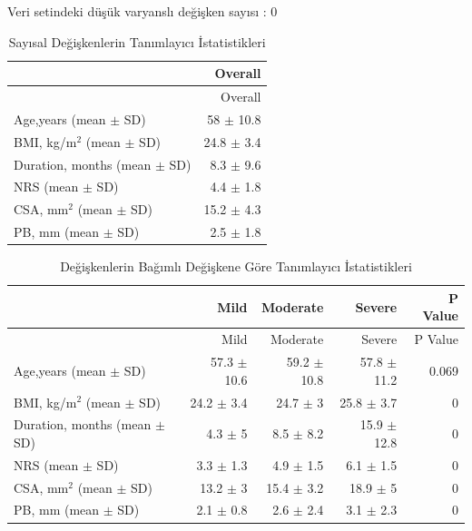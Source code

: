 \documentclass[12pt,twoside]{deuthesis}
\begin{document}
Veri setindeki düşük varyanslı değişken sayısı : 0
\begin{longtable}[]{@{}lr@{}}
\caption{\label{tab:deneme} Sayısal Değişkenlerin Tanımlayıcı İstatistikleri}\tabularnewline
\toprule
& Overall \\
\midrule
\endfirsthead
\toprule
& Overall \\
\midrule
\endhead
Age,years (mean \(\pm\) SD) & 58 \(\pm\) 10.8 \\
BMI, kg/m\(^2\) (mean \(\pm\) SD) & 24.8 \(\pm\) 3.4 \\
Duration, months (mean \(\pm\) SD) & 8.3 \(\pm\) 9.6 \\
NRS (mean \(\pm\) SD) & 4.4 \(\pm\) 1.8 \\
CSA, mm\(^2\) (mean \(\pm\) SD) & 15.2 \(\pm\) 4.3 \\
PB, mm (mean \(\pm\) SD) & 2.5 \(\pm\) 1.8 \\
\bottomrule
\end{longtable}
\begin{longtable}[]{@{}lrrrr@{}}
\caption{\label{tab:descrip} Değişkenlerin Bağımlı Değişkene Göre Tanımlayıcı İstatistikleri}\tabularnewline
\toprule
& Mild & Moderate & Severe & P Value \\
\midrule
\endfirsthead
\toprule
& Mild & Moderate & Severe & P Value \\
\midrule
\endhead
Age,years (mean \(\pm\) SD) & 57.3 \(\pm\) 10.6 & 59.2 \(\pm\) 10.8 & 57.8 \(\pm\) 11.2 & 0.069 \\
BMI, kg/m\(^2\) (mean \(\pm\) SD) & 24.2 \(\pm\) 3.4 & 24.7 \(\pm\) 3 & 25.8 \(\pm\) 3.7 & 0 \\
Duration, months (mean \(\pm\) SD) & 4.3 \(\pm\) 5 & 8.5 \(\pm\) 8.2 & 15.9 \(\pm\) 12.8 & 0 \\
NRS (mean \(\pm\) SD) & 3.3 \(\pm\) 1.3 & 4.9 \(\pm\) 1.5 & 6.1 \(\pm\) 1.5 & 0 \\
CSA, mm\(^2\) (mean \(\pm\) SD) & 13.2 \(\pm\) 3 & 15.4 \(\pm\) 3.2 & 18.9 \(\pm\) 5 & 0 \\
PB, mm (mean \(\pm\) SD) & 2.1 \(\pm\) 0.8 & 2.6 \(\pm\) 2.4 & 3.1 \(\pm\) 2.3 & 0 \\
\bottomrule
\end{longtable}
\hfill\break
\hfill\break
~
\end{document}

